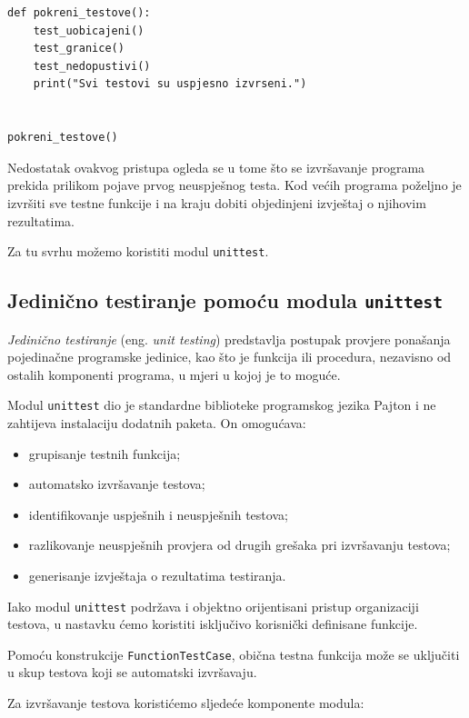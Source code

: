 \begin{verbatim}
def pokreni_testove():
    test_uobicajeni()
    test_granice()
    test_nedopustivi()
    print("Svi testovi su uspjesno izvrseni.")


pokreni_testove()
\end{verbatim}

Nedostatak ovakvog pristupa ogleda se u tome što se 
izvršavanje programa prekida prilikom pojave prvog 
neuspješnog testa. Kod većih programa poželjno je 
izvršiti sve testne funkcije i na kraju dobiti 
objedinjeni izvještaj o njihovim rezultatima.

Za tu svrhu možemo koristiti modul \texttt{unittest}.


\subsection{Jedinično testiranje pomoću modula \texttt{unittest}}

\textit{Jedinično testiranje} (eng. \emph{unit testing}) 
predstavlja postupak provjere ponašanja pojedinačne 
programske jedinice, kao što je funkcija ili procedura, 
nezavisno od ostalih komponenti programa, u mjeri u 
kojoj je to moguće.

Modul \texttt{unittest} dio je standardne biblioteke 
programskog jezika Pajton i ne zahtijeva instalaciju 
dodatnih paketa. On omogućava:

\begin{itemize}
	\item grupisanje testnih funkcija;
	\item automatsko izvršavanje testova;
	\item identifikovanje uspješnih i neuspješnih testova;
	\item razlikovanje neuspješnih provjera od drugih 
	grešaka pri izvršavanju testova;
	\item generisanje izvještaja o rezultatima testiranja.
\end{itemize}

Iako modul \texttt{unittest} podržava i objektno 
orijentisani pristup organizaciji testova, u nastavku 
ćemo koristiti isključivo korisnički definisane 
funkcije.

Pomoću konstrukcije \texttt{FunctionTestCase}, obična 
testna funkcija može se uključiti u skup testova koji 
se automatski izvršavaju.

Za izvršavanje testova koristićemo sljedeće komponente 
modula:

